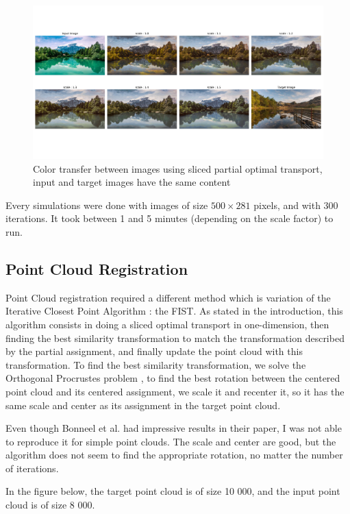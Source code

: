 \documentclass[a4paper,12pt]{article}
\begin{document}
\begin{figure}[H]
\includegraphics[trim=0cm 3cm 0cm 1.5cm, width = \columnwidth]{landscape12.pdf}
\caption{Color transfer between images using sliced partial optimal transport, input and target images have the same content}\label{12_fig}
\end{figure}

Every simulations were done with images of size $500 \times 281$ pixels, and with 300 iterations. It took between 1 and 5 minutes (depending on the scale factor) to run.

\subsection{Point Cloud Registration}

Point Cloud registration required a different method which is variation of the Iterative Closest Point Algorithm : the FIST. As stated in the introduction, this algorithm consists in doing a sliced optimal transport in one-dimension, then finding the best similarity transformation to match the transformation described by the partial assignment, and finally update the point cloud with this transformation. To find the best similarity transformation, we solve the Orthogonal Procrustes problem \cite{schonemann1966generalized}, to find the best rotation between the centered point cloud and its centered assignment, we scale it and recenter it, so it has the same scale and center as its assignment in the target point cloud.

Even though Bonneel et al. had impressive results in their paper, I was not able to reproduce it for simple point clouds. The scale and center are good, but the algorithm does not seem to find the appropriate rotation, no matter the number of iterations.

In the figure below, the target point cloud is of size 10 000, and the input point cloud is of size 8 000.
\end{document}
